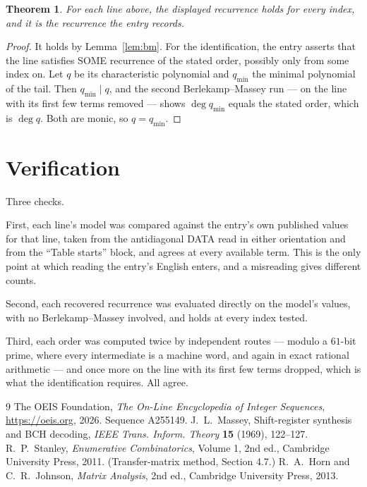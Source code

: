 \documentclass[11pt,a4paper]{article}
\theoremstyle{plain}
\newtheorem{theorem}{Theorem}
\theoremstyle{definition}
\begin{document}
\begin{theorem}
For each line above, the displayed recurrence holds for every index, and it is the recurrence
the entry records.
\end{theorem}

\begin{proof}
It holds by Lemma~\ref{lem:bm}. For the identification, the entry asserts that the line
satisfies SOME recurrence of the stated order, possibly only from some index on. Let $q$ be its
characteristic polynomial and $q_{\min}$ the minimal polynomial of the tail. Then
$q_{\min}\mid q$, and the second Berlekamp--Massey run --- on the line with its first few
terms removed --- shows $\deg q_{\min}$ equals the stated order, which is $\deg q$. Both are
monic, so $q=q_{\min}$.
\end{proof}

\section{Verification}

Three checks.

First, each line's model was compared against the entry's own published values for that line,
taken from the antidiagonal DATA read in either orientation and from the ``Table starts''
block, and agrees at every available term. This is the only point at which reading the entry's
English enters, and a misreading gives different counts.

Second, each recovered recurrence was evaluated directly on the model's values, with no
Berlekamp--Massey involved, and holds at every index tested.

Third, each order was computed twice by independent routes --- modulo a $61$-bit prime, where
every intermediate is a machine word, and again in exact rational arithmetic --- and once more
on the line with its first few terms dropped, which is what the identification requires. All
agree.

\begin{thebibliography}{9}
 The OEIS Foundation, \emph{The On-Line Encyclopedia of Integer
Sequences}, \url{https://oeis.org}, 2026. Sequence A255149.
 J.~L.~Massey, Shift-register synthesis and BCH decoding, \emph{IEEE
Trans. Inform. Theory} \textbf{15} (1969), 122--127.
 R.~P.~Stanley, \emph{Enumerative Combinatorics}, Volume 1, 2nd ed.,
Cambridge University Press, 2011. (Transfer-matrix method, Section 4.7.)
 R.~A.~Horn and C.~R.~Johnson, \emph{Matrix Analysis}, 2nd ed., Cambridge
University Press, 2013.
\end{thebibliography}
\end{document}
